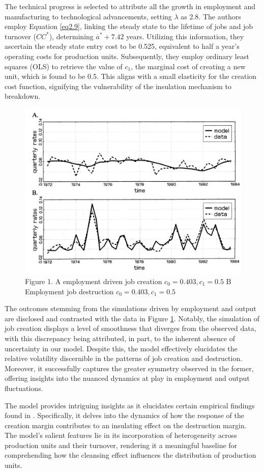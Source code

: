 \documentclass[12pt]{article}
\begin{document}
The technical progress is selected to attribute all the growth in employment and manufacturing to technological
advancements, setting \(\lambda\) as 2.8. The authors employ Equation \ref{eq2.9}, linking the steady state to the
lifetime of jobs and job turnover (\(CC^*\)), determining \(\overline{a}^*+7.42\) years. Utilizing this information,
they ascertain the steady state entry cost to be 0.525, equivalent to half a year's operating costs for production
units. Subsequently, they employ ordinary least squares (OLS) to retrieve the value of \(c_1\), the marginal cost of
creating a new unit, which is found to be 0.5. This aligns with a small elasticity for the creation cost function,
signifying the vulnerability of the insulation mechanism to breakdown. 
\begin{figure}
    \centering
    \includegraphics[scale = 0.6]{Plot2.5.png}
    \caption{Figure 1. A employment driven job creation \(c_0=0.403, c_1=0.5\) B Employment job destruction \(c_0=0.403, c_1=0.5\)} 
    \label{plot:2.5}
\end{figure}
The outcomes stemming from the simulations driven by employment and output are disclosed and contrasted with the data in
Figure \ref{plot:2.5}. Notably, the simulation of job creation displays a level of smoothness that diverges from the
observed 
data, with this discrepancy being attributed, in part, to the inherent absence of uncertainty in our model. Despite
this, the model effectively elucidates the relative volatility discernible in the patterns of job creation and
destruction. Moreover, it successfully captures the greater symmetry observed in the former, offering insights into the
nuanced dynamics at play in employment and output fluctuations. 
\par
The model provides intriguing insights as it elucidates certain empirical findings found in \cite{DAvHalt90,DavHalt92}.
Specifically, it delves into the dynamics of how the response of the creation margin contributes to an insulating effect
on the destruction margin. The model's salient features lie in its incorporation of heterogeneity across production
units and their turnover, rendering it a meaningful baseline for comprehending how the cleansing effect influences the
distribution of production units. 
\end{document}
